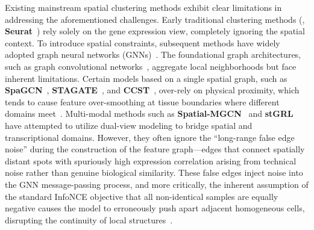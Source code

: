 \documentclass[lettersize,journal]{IEEEtran}
\begin{document}
Existing mainstream spatial clustering methods exhibit clear limitations in addressing the aforementioned challenges. Early traditional clustering methods (\eg, \textbf{Seurat}~\cite{stuart2019comprehensive}) rely solely on the gene expression view, completely ignoring the spatial context. To introduce spatial constraints, subsequent methods have widely adopted graph neural networks (GNNs)~\cite{wu2020comprehensive}. The foundational graph architectures, such as graph convolutional networks~\cite{kipf2016gcn}, aggregate local neighborhoods but face inherent limitations. Certain models based on a single spatial graph, such as \textbf{SpaGCN}~\cite{hu2021spagcn}, \textbf{STAGATE}~\cite{dong2022stagate}, and \textbf{CCST}~\cite{li2022cell}, over-rely on physical proximity, which tends to cause feature over-smoothing at tissue boundaries where different domains meet~\cite{li2018deeper}. Multi-modal methods such as \textbf{Spatial-MGCN}~\cite{wang2023spatialmgcn} and \textbf{stGRL}~\cite{lu2025stgrl} have attempted to utilize dual-view modeling to bridge spatial and transcriptional domains. However, they often ignore the ``long-range false edge noise'' during the construction of the feature graph---edges that connect spatially distant spots with spuriously high expression correlation arising from technical noise rather than genuine biological similarity. These false edges inject noise into the GNN message-passing process, and more critically, the inherent assumption of the standard InfoNCE objective that all non-identical samples are equally negative causes the model to erroneously push apart adjacent homogeneous cells, disrupting the continuity of local structures~\cite{chen2020measuring}.
\end{document}
